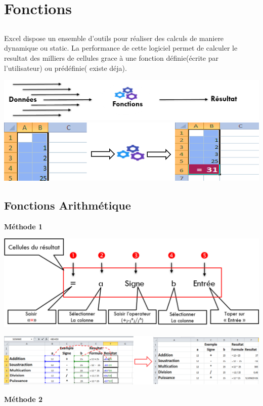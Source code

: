 \chapter{Fonctions}
\section*{}
Excel dispose un ensemble d'outils pour réaliser des calculs de maniere dynamique ou static. La performance de cette logiciel permet de calculer le resultat des milliers de cellules grace à une fonction définie(écrite par l'utilisateur) ou prédéfinie( existe déja).

\begin{center}  
	\includegraphics[scale=0.2,width= \linewidth]{img/fonctions}
	\includegraphics[scale=0.2,width= \linewidth]{img/fonctions2}
\end{center}

\section{Fonctions Arithmétique}
\textbf{{{ Méthode 1}}}
\begin{center}  
	\includegraphics[scale=0.2,width= \linewidth]{img/arithmetique1} 
\end{center}
\begin{Exemple}
\end{Exemple}
\begin{center}  
	\includegraphics[scale=0.2,width= \linewidth]{img/arithmetique2} 
\end{center}
\newpage
\textbf{{{ Méthode 2}}}

